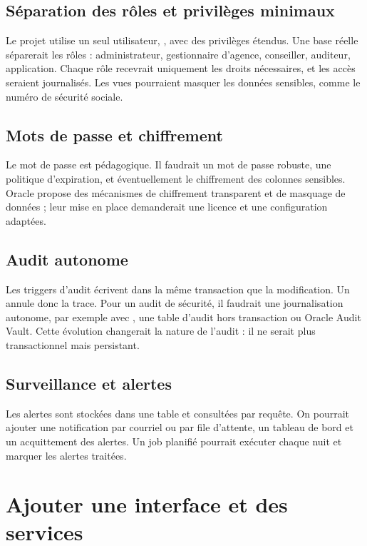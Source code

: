 \subsection{Séparation des rôles et privilèges minimaux}

Le projet utilise un seul utilisateur, , avec des privilèges
étendus. Une base réelle séparerait les rôles : administrateur, gestionnaire
d'agence, conseiller, auditeur, application. Chaque rôle recevrait uniquement
les droits nécessaires, et les accès seraient journalisés. Les vues pourraient
masquer les données sensibles, comme le numéro de sécurité sociale.

\subsection{Mots de passe et chiffrement}

Le mot de passe  est pédagogique. Il faudrait un mot de passe
robuste, une politique d'expiration, et éventuellement le chiffrement des
colonnes sensibles. Oracle propose des mécanismes de chiffrement transparent
et de masquage de données ; leur mise en place demanderait une licence et une
configuration adaptées.

\subsection{Audit autonome}

Les triggers d'audit écrivent dans la même transaction que la modification.
Un  annule donc la trace. Pour un audit de sécurité, il faudrait
une journalisation autonome, par exemple avec , une table
d'audit hors transaction ou Oracle Audit Vault. Cette évolution changerait la
nature de l'audit : il ne serait plus transactionnel mais persistant.

\subsection{Surveillance et alertes}

Les alertes sont stockées dans une table et consultées par requête. On pourrait
ajouter une notification par courriel ou par file d'attente, un tableau de bord
et un acquittement des alertes. Un job planifié pourrait exécuter
 chaque nuit et marquer les alertes traitées.

\section{Ajouter une interface et des services}


